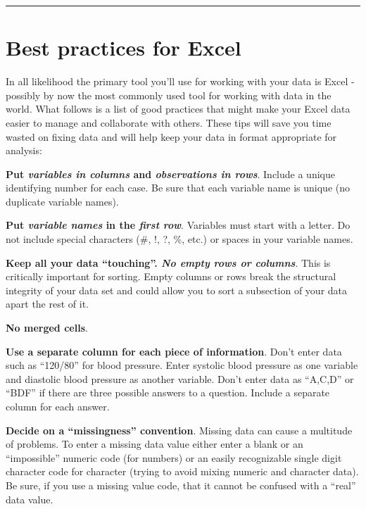 \documentclass[
  letterpaper,
  DIV=11,
  numbers=noendperiod]{scrreprt}
\begin{document}
\begin{center}\rule{0.5\linewidth}{0.5pt}\end{center}

\hypertarget{best-practices-for-excel}{%
\section*{Best practices for Excel}\label{best-practices-for-excel}}

In all likelihood the primary tool you'll use for working with your data
is Excel - possibly by now the most commonly used tool for working with
data in the world. What follows is a list of good practices that might
make your Excel data easier to manage and collaborate with others. These
tips will save you time wasted on fixing data and will help keep your
data in format appropriate for analysis:

\textbf{Put \emph{variables in columns} and \emph{observations in
rows}}. Include a unique identifying number for each case. Be sure that
each variable name is unique (no duplicate variable names).

\textbf{Put \emph{variable names} in the \emph{first row}}. Variables
must start with a letter. Do not include special characters (\#, !, ?,
\%, etc.) or spaces in your variable names.

\textbf{Keep all your data ``touching''. \emph{No empty rows or
columns}}. This is critically important for sorting. Empty columns or
rows break the structural integrity of your data set and could allow you
to sort a subsection of your data apart the rest of it.

\textbf{No merged cells}.

\textbf{Use a separate column for each piece of information}. Don't
enter data such as ``120/80'' for blood pressure. Enter systolic blood
pressure as one variable and diastolic blood pressure as another
variable. Don't enter data as ``A,C,D'' or ``BDF'' if there are three
possible answers to a question. Include a separate column for each
answer.

\textbf{Decide on a ``missingness'' convention}. Missing data can cause
a multitude of problems. To enter a missing data value either enter a
blank or an ``impossible'' numeric code (for numbers) or an easily
recognizable single digit character code for character (trying to avoid
mixing numeric and character data). Be sure, if you use a missing value
code, that it cannot be confused with a ``real'' data value.
\end{document}

